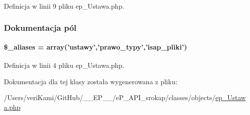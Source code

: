 Definicja w linii 9 pliku ep\-\_\-\-Ustawa.\-php.



\subsubsection{Dokumentacja pól}
\hypertarget{classep___ustawa_ab4e31d75f0bc5d512456911e5d01366b}{
\paragraph[{\$\-\_\-aliases}]{\setlength{\rightskip}{0pt plus 5cm}\$\-\_\-aliases = array('ustawy','prawo\-\_\-typy','isap\-\_\-pliki')}}\label{classep___ustawa_ab4e31d75f0bc5d512456911e5d01366b}


Definicja w linii 4 pliku ep\-\_\-\-Ustawa.\-php.



Dokumentacja dla tej klasy została wygenerowana z pliku\-:\begin{DoxyCompactItemize}
\item 
/\-Users/veri\-Kami/\-Git\-Hub/\-\_\-\-\_\-\-E\-P\-\_\-\-\_\-/e\-P\-\_\-\-A\-P\-I\-\_\-srokap/classes/objects/\hyperlink{ep___ustawa_8php}{ep\-\_\-\-Ustawa.\-php}\end{DoxyCompactItemize}
